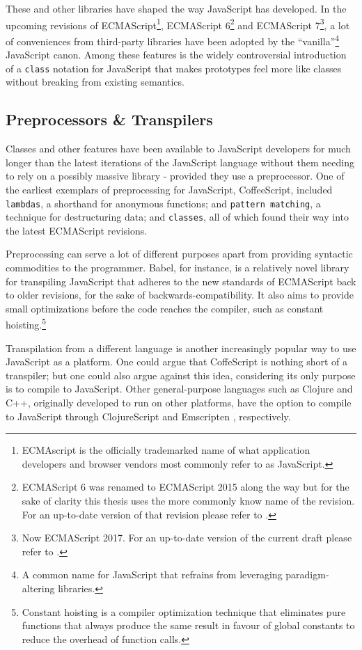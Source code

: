 \documentclass[oneside,11pt,xetex]{scrbook}
\begin{document}
These and other libraries have shaped the way JavaScript has developed. In the
upcoming revisions of ECMAScript\footnote{ECMAscript is the officially trademarked
name of what application developers and browser vendors most commonly refer to as
JavaScript.}, ECMAScript 6\footnote{ECMAScript 6 was renamed to ECMAScript 2015
along the way but for the sake of clarity this thesis uses the more commonly
know name of the revision. For an up-to-date version of that revision please
refer to \parencite{ECMA6}.} and ECMAScript 7\footnote{Now ECMAScript 2017. For
an up-to-date version of the current draft please refer to \parencite{ECMA7}.}, a
lot of conveniences from third-party libraries have been adopted by the
``vanilla''\footnote{A common name for JavaScript that refrains from leveraging
paradigm-altering libraries.} JavaScript canon.
Among these features is the widely controversial introduction of a \texttt{class}
notation for JavaScript that makes prototypes feel more like classes without
breaking from existing semantics.

\subsection{Preprocessors \& Transpilers}
\label{pretrans}

Classes and other features have been available to JavaScript developers for much
longer than the latest iterations of the JavaScript language without them needing
to rely on a possibly massive library - provided they use a preprocessor.
One of the earliest exemplars of preprocessing for JavaScript, CoffeeScript, included
\texttt{lambdas}, a shorthand for anonymous functions; and \texttt{pattern matching},
a technique for destructuring data; and \texttt{classes}, all of which found
their way into the latest ECMAScript revisions.

Preprocessing can serve a lot of different purposes apart from providing
syntactic commodities to the programmer. Babel, for instance, is a relatively
novel library for transpiling JavaScript that adheres to the new standards
of ECMAScript back to older revisions, for the sake of backwards-compatibility.
It also aims to provide small optimizations before the code reaches the compiler,
such as constant hoisting.\footnote{Constant hoisting is a compiler optimization
technique that eliminates pure functions that always produce the same result in favour
of global constants to reduce the overhead of function calls.}

Transpilation from a different language is another increasingly popular
way to use JavaScript as a platform. One could argue that CoffeScript
is nothing short of a transpiler; but one could also argue against this idea,
considering its only purpose is to compile to JavaScript. Other general-purpose
languages such as Clojure and C++, originally developed to run on other platforms,
have the option to compile to JavaScript through ClojureScript \parencite{CLJS} and
Emscripten \parencite{ZAKA}, respectively.
\end{document}
